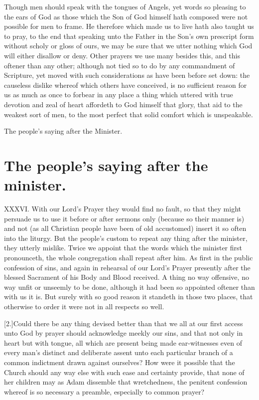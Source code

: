 Though men should speak with the tongues of Angels, yet  words so pleasing to the ears of God as those which the Son of God himself hath composed were not possible for men to frame.
 He therefore which made us to live hath also taught us to pray, to the end that speaking unto the Father in the Son’s own prescript form without scholy or gloss of ours, we may be sure that we utter nothing which God will either disallow or deny. Other prayers we use many besides this, and this oftener than any other; although not tied so to do by any commandment of Scripture, yet moved with such considerations as have been before set down: the causeless dislike whereof which others have conceived, is no sufficient reason for us as much as once to forbear in any place a thing which uttered with true devotion and zeal of heart affordeth to God himself that glory, that aid to the weakest sort of men, to the most perfect that solid comfort which is unspeakable.


The people’s saying after the Minister.
\section*{The people’s saying after the minister.}
XXXVI. With our Lord’s Prayer they would find no fault, so that they might persuade us to use it before or after sermons only (because so their manner is) and not (as all Christian people have been of old accustomed) insert it so often into the liturgy. But the people’s custom to repeat any thing after the minister, they utterly mislike. Twice we appoint that the words which the minister first pronounceth, the whole congregation shall repeat after him. As first in the public confession of sins, and again in rehearsal of our Lord’s Prayer presently after the blessed Sacrament of his  Body and Blood received.
 A thing no way offensive, no way unfit or unseemly to be done, although it had been so appointed oftener than with us it is. But surely with so good reason it standeth in those two places, that otherwise to order it were not in all respects so well.

[2.]Could there be any thing devised better than that we all at our first access unto God by prayer should acknowledge meekly our sins, and that not only in heart but with tongue, all which are present being made ear-witnesses even of every man’s distinct and deliberate assent unto each particular branch of a common indictment drawn against ourselves? How were it possible that the Church should any way else with such ease and certainty provide, that none of her children may as Adam dissemble that wretchedness, the penitent confession whereof is so necessary a preamble, especially to common prayer?

